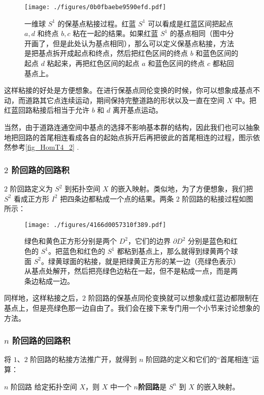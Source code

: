 \begin{figure}[ht]
\centering
\texttt{[image: ./figures/0b0fbaebe9590efd.pdf]}
\caption{一维球 $S^1$ 的保基点粘接过程。红蓝 $S^1$ 可以看成是红蓝区间把起点 $a, d$ 和终点 $b, c$ 粘在一起的结果。如果红蓝 $S^1$ 的基点相同（图中分开画了，但是此处认为基点相同），那么可以定义保基点粘接，方法是把基点拆开成起点和终点，然后把红色区间的终点 $b$ 和蓝色区间的起点 $d$ 粘起来，再把红色区间的起点 $a$ 和蓝色区间的终点 $c$ 都粘回基点上。} \label{fig_HomT4_2}
\end{figure}

这样粘接的好处是方便想象。在进行保基点同伦变换的时候，你可以想象成基点不动，而道路其它点连续运动，期间保持完整道路的形状以及一直在空间 $X$ 中。把红蓝回路粘接后相当于允许 $b$ 和 $d$ 离开基点运动。

当然，由于道路连通空间中基点的选择不影响基本群的结构，因此我们也可以抽象地把回路的首尾相连看成各自的起始点拆开后再把彼此的首尾相连的过程，图示依然参考\autoref{fig_HomT4_2} .

\subsubsection{$2$ 阶回路的回路积}

$2$ 阶回路定义为 $S^2$ 到拓扑空间 $X$ 的嵌入映射。类似地，为了方便想象，我们把 $S^2$ 看成正方形 $I^2$ 把四条边都粘成一个点的结果。两条 $2$ 阶回路的粘接过程如图所示：

\begin{figure}[ht]
\centering
\texttt{[image: ./figures/4166d0057310f389.pdf]}
\caption{绿色和黄色正方形分别是两个 $D^2$，它们的边界 $\partial D^2$ 分别是蓝色和红色的 $S^1$。把蓝色和红色的 $S^1$ 都粘到基点上，那么就得到绿黄两个球面 $S^2$。绿黄球面的粘接，就是把绿黄正方形的某一边（亮绿色表示）从基点处解开，然后把亮绿色边粘在一起，但不是粘成一点，而是两条边粘成一边。} \label{fig_HomT4_3}
\end{figure}

同样地，这样粘接之后，$2$ 阶回路的保基点同伦变换就可以想象成红蓝边都限制在基点上，但是亮绿色那一边自由了。我们会在接下来专门用一个小节来讨论想象的方法。%

\subsubsection{$n$ 阶回路的回路积}

将 $1$、$2$ 阶回路的粘接方法推广开，就得到 $n$ 阶回路的定义和它们的“首尾相连”运算：

\begin{definition}{$n$ 阶回路}
给定拓扑空间 $X$，则 $X$ 中一个 $n$\textbf{阶回路}是 $S^n$ 到 $X$ 的嵌入映射。
\end{definition}

